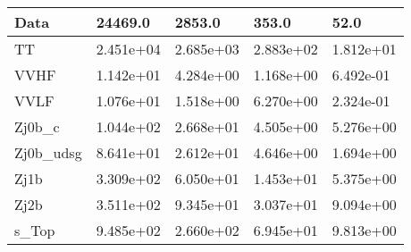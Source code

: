 \begin{table}
{\begin{tabularx}{\textwidth}{|X|X|X|X|X|}
\hline
Data & 24469.0 & 2853.0 & 353.0 & 52.0 \\
\hline
TT & 2.451e+04 & 2.685e+03 & 2.883e+02 & 1.812e+01 \\
VVHF & 1.142e+01 & 4.284e+00 & 1.168e+00 & 6.492e-01 \\
VVLF & 1.076e+01 & 1.518e+00 & 6.270e+00 & 2.324e-01 \\
Zj0b\_c & 1.044e+02 & 2.668e+01 & 4.505e+00 & 5.276e+00 \\
Zj0b\_udsg & 8.641e+01 & 2.612e+01 & 4.646e+00 & 1.694e+00 \\
Zj1b & 3.309e+02 & 6.050e+01 & 1.453e+01 & 5.375e+00 \\
Zj2b & 3.511e+02 & 9.345e+01 & 3.037e+01 & 9.094e+00 \\
s\_Top & 9.485e+02 & 2.660e+02 & 6.945e+01 & 9.813e+00 \\
\hline
\end{tabularx}
}
\label{tab:cr-Zee-2018}
\end{table}

